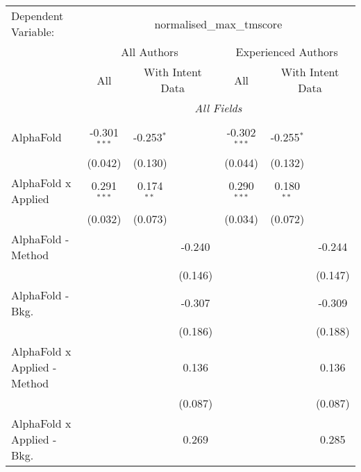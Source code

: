 \begingroup
\centering
\begin{tabular}{lcccccc}
   \tabularnewline \midrule \midrule
   Dependent Variable: & \multicolumn{6}{c}{normalised\_max\_tmscore}\\
 & \multicolumn{3}{c}{All Authors} & \multicolumn{3}{c}{Experienced Authors} \\
\cmidrule(lr){2-4} \cmidrule(lr){5-7}
 & \multicolumn{1}{c}{All} & \multicolumn{2}{c}{With Intent Data} & \multicolumn{1}{c}{All} & \multicolumn{2}{c}{With Intent Data} \\
\cmidrule(lr){2-2} \cmidrule(lr){3-4} \cmidrule(lr){5-5} \cmidrule(lr){6-7}
 & \multicolumn{6}{c}{\textit{All Fields}} \\ \\
   AlphaFold                      & -0.301$^{***}$ & -0.253$^{*}$ &               & -0.302$^{***}$ & -0.255$^{*}$ &   \\   
                                  & (0.042)        & (0.130)      &               & (0.044)        & (0.132)      &   \\   
   AlphaFold x Applied            & 0.291$^{***}$  & 0.174$^{**}$ &               & 0.290$^{***}$  & 0.180$^{**}$ &   \\   
                                  & (0.032)        & (0.073)      &               & (0.034)        & (0.072)      &   \\   
   AlphaFold - Method             &                &              & -0.240        &                &              & -0.244\\   
                                  &                &              & (0.146)       &                &              & (0.147)\\   
   AlphaFold - Bkg.               &                &              & -0.307        &                &              & -0.309\\   
                                  &                &              & (0.186)       &                &              & (0.188)\\   
   AlphaFold x Applied - Method   &                &              & 0.136         &                &              & 0.136\\   
                                  &                &              & (0.087)       &                &              & (0.087)\\   
   AlphaFold x Applied - Bkg.     &                &              & 0.269         &                &              & 0.285\\   

\end{tabular}
